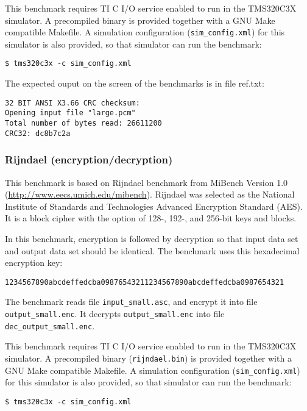 This benchmark requires TI C I/O service enabled to run in the TMS320C3X simulator.
A precompiled binary is provided together with a GNU Make compatible Makefile.
A simulation configuration (\texttt{sim\_config.xml}) for this simulator is also provided, so that simulator can run the benchmark:

\begin{verbatim}
$ tms320c3x -c sim_config.xml
\end{verbatim}

\noindent The expected ouput on the screen of the benchmarks is in file ref.txt:

\begin{verbatim}
32 BIT ANSI X3.66 CRC checksum:
Opening input file "large.pcm"
Total number of bytes read: 26611200
CRC32: dc8b7c2a
\end{verbatim}

\subsubsection{Rijndael (encryption/decryption)}

This benchmark is based on Rijndael benchmark from MiBench Version 1.0 (\url{http://www.eecs.umich.edu/mibench}).
Rijndael was selected as the National Institute of Standards and Technologies Advanced Encryption Standard (AES).
It is a block cipher with the option of 128-, 192-, and 256-bit keys and blocks.

In this benchmark, encryption is followed by decryption so that input data set and output data set should be identical.
The benchmark uses this hexadecimal encryption key:
\begin{verbatim}
1234567890abcdeffedcba09876543211234567890abcdeffedcba0987654321
\end{verbatim}
The benchmark reads file \texttt{input\_small.asc}, and encrypt it into file \texttt{output\_small.enc}.
It decrypts \texttt{output\_small.enc} into file \texttt{dec\_output\_small.enc}.

This benchmark requires TI C I/O service enabled to run in the TMS320C3X simulator.
A precompiled binary (\texttt{rijndael.bin}) is provided together with a GNU Make compatible Makefile.
A simulation configuration (\texttt{sim\_config.xml}) for this simulator is also provided, so that simulator can run the benchmark:

\begin{verbatim}
$ tms320c3x -c sim_config.xml
\end{verbatim}


